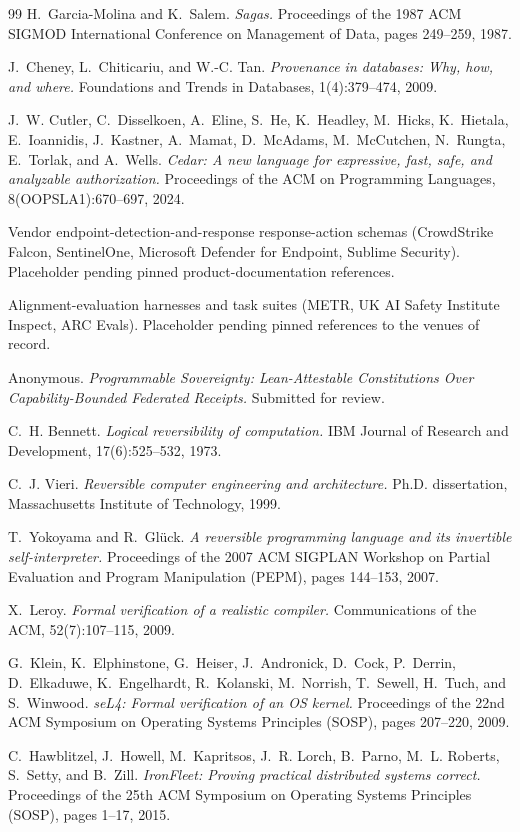 \documentclass[11pt,letterpaper]{article}
\begin{document}

\begin{thebibliography}{99}
H.~Garcia-Molina and K.~Salem.
\emph{Sagas.}
Proceedings of the 1987 ACM SIGMOD International Conference on Management
of Data, pages 249--259, 1987.

J.~Cheney, L.~Chiticariu, and W.-C. Tan.
\emph{Provenance in databases: Why, how, and where.}
Foundations and Trends in Databases, 1(4):379--474, 2009.

J.~W. Cutler, C.~Disselkoen, A.~Eline, S.~He, K.~Headley, M.~Hicks,
K.~Hietala, E.~Ioannidis, J.~Kastner, A.~Mamat, D.~McAdams,
M.~McCutchen, N.~Rungta, E.~Torlak, and A.~Wells.
\emph{Cedar: A new language for expressive, fast, safe, and analyzable
authorization.}
Proceedings of the ACM on Programming Languages, 8(OOPSLA1):670--697,
2024.

Vendor endpoint-detection-and-response response-action schemas
(CrowdStrike Falcon, SentinelOne, Microsoft Defender for Endpoint,
Sublime Security). Placeholder pending pinned product-documentation
references.

Alignment-evaluation harnesses and task suites (METR, UK AI Safety
Institute Inspect, ARC Evals). Placeholder pending pinned references to
the venues of record.

Anonymous.
\emph{Programmable Sovereignty: Lean-Attestable Constitutions Over
Capability-Bounded Federated Receipts.}
Submitted for review.

C.~H. Bennett.
\emph{Logical reversibility of computation.}
IBM Journal of Research and Development, 17(6):525--532, 1973.

C.~J. Vieri.
\emph{Reversible computer engineering and architecture.}
Ph.D. dissertation, Massachusetts Institute of Technology, 1999.

T.~Yokoyama and R.~Gl\"uck.
\emph{A reversible programming language and its invertible
self-interpreter.}
Proceedings of the 2007 ACM SIGPLAN Workshop on Partial Evaluation and
Program Manipulation (PEPM), pages 144--153, 2007.

X.~Leroy.
\emph{Formal verification of a realistic compiler.}
Communications of the ACM, 52(7):107--115, 2009.

G.~Klein, K.~Elphinstone, G.~Heiser, J.~Andronick, D.~Cock, P.~Derrin,
D.~Elkaduwe, K.~Engelhardt, R.~Kolanski, M.~Norrish, T.~Sewell,
H.~Tuch, and S.~Winwood.
\emph{seL4: Formal verification of an OS kernel.}
Proceedings of the 22nd ACM Symposium on Operating Systems Principles
(SOSP), pages 207--220, 2009.

C.~Hawblitzel, J.~Howell, M.~Kapritsos, J.~R. Lorch, B.~Parno,
M.~L. Roberts, S.~Setty, and B.~Zill.
\emph{IronFleet: Proving practical distributed systems correct.}
Proceedings of the 25th ACM Symposium on Operating Systems Principles
(SOSP), pages 1--17, 2015.
\end{thebibliography}
\end{document}
